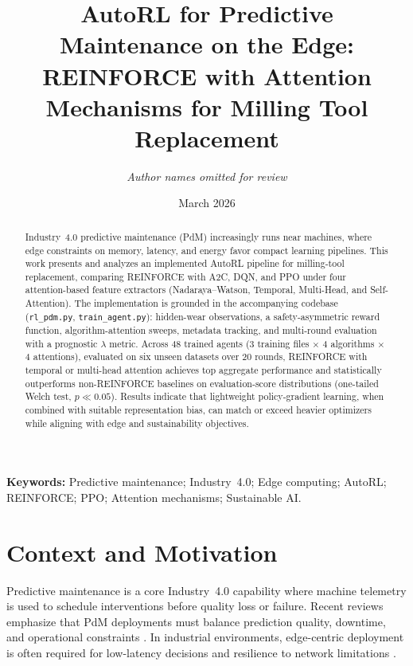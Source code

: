 \documentclass[11pt]{article}
\title{AutoRL for Predictive Maintenance on the Edge:\\
REINFORCE with Attention Mechanisms for Milling Tool Replacement}
\author{\textit{Author names omitted for review}}
\date{March 2026}
\begin{document}
\maketitle

\begin{abstract}
Industry~4.0 predictive maintenance (PdM) increasingly runs near machines, where edge constraints on memory, latency, and energy favor compact learning pipelines. This work presents and analyzes an implemented AutoRL pipeline for milling-tool replacement, comparing \textsc{REINFORCE} with \textsc{A2C}, \textsc{DQN}, and \textsc{PPO} under four attention-based feature extractors (Nadaraya--Watson, Temporal, Multi-Head, and Self-Attention). The implementation is grounded in the accompanying codebase (\texttt{rl\_pdm.py}, \texttt{train\_agent.py}): hidden-wear observations, a safety-asymmetric reward function, algorithm-attention sweeps, metadata tracking, and multi-round evaluation with a prognostic $\lambda$ metric. Across 48 trained agents (3 training files $\times$ 4 algorithms $\times$ 4 attentions), evaluated on six unseen datasets over 20 rounds, \textsc{REINFORCE} with temporal or multi-head attention achieves top aggregate performance and statistically outperforms non-\textsc{REINFORCE} baselines on evaluation-score distributions (one-tailed Welch test, $p \ll 0.05$). Results indicate that lightweight policy-gradient learning, when combined with suitable representation bias, can match or exceed heavier optimizers while aligning with edge and sustainability objectives.
\end{abstract}

\textbf{Keywords:} Predictive maintenance; Industry~4.0; Edge computing; AutoRL; \textsc{REINFORCE}; \textsc{PPO}; Attention mechanisms; Sustainable AI.

\section{Context and Motivation}
Predictive maintenance is a core Industry~4.0 capability where machine telemetry is used to schedule interventions before quality loss or failure. Recent reviews emphasize that PdM deployments must balance prediction quality, downtime, and operational constraints \citep{Zonta2020PdMReview,Siraskar2023RLReview}. In industrial environments, edge-centric deployment is often required for low-latency decisions and resilience to network limitations \citep{EdgeIndustrialInternet2021,EdgeComputingIndustrialMachines2019}.
\end{document}
